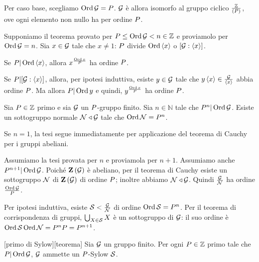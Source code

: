 Per caso base, scegliamo $\operatorname{\operatorname{Ord}}{\mathcal{G}} = P$.
$\mathcal{G}$ \`e allora isomorfo al gruppo ciclico
$\frac{\mathbb{Z}}{\left ( P \right )}$,
ove ogni elemento non nullo ha per ordine $P$.
\par
Supponiamo il teorema provato per
$P \leq \operatorname{\operatorname{Ord}}{\mathcal{G}} < n \in \mathbb{Z}$
e proviamolo per $\operatorname{\operatorname{Ord}}{\mathcal{G}} = n$.
Sia $x \in \mathcal{G}$ tale che $x \neq 1$:
$P$ divide $\operatorname{\operatorname{Ord}}{\left < x \right >}$ o
$[\mathcal{G}:\left < x \right >]$.
\par
Se $P | \operatorname{\operatorname{Ord}}{\left < x \right >}$, allora
$x^{\frac{\operatorname{\operatorname{Ord}}{x}}{P}}$ ha ordine $P$.
\par
Se $P | [\mathcal{G}:\left < x \right >]$,
allora, per ipotesi induttiva, esiste $y \in \mathcal{G}$ tale che
$y\left < x \right > \in \frac{\mathcal{G}}{\left < x \right >}$ abbia
ordine $P$. Ma allora $P | \operatorname{\operatorname{Ord}}{y}$ e quindi,
$y^{\frac{\operatorname{\operatorname{Ord}}{x}}{P}}$ ha ordine $P$.
\EndProof
\begin{Theorem}
	Sia $P \in \mathbb{Z}$ primo e sia
	$\mathcal{G}$ un $P$-gruppo finito.
	Sia $n \in \mathbb{N}$ tale che $P^n | \operatorname{\operatorname{Ord}}{\mathcal{G}}$.
	Esiste un sottogruppo normale
	$\mathcal{N} \triangleleft \mathcal{G}$ tale che
	$\operatorname{\operatorname{Ord}}{\mathcal{N}} = P^n$.
\end{Theorem}
\Proof
Se $n = 1$, la tesi segue immediatamente per applicazione del teorema di Cauchy
per i gruppi abeliani.
\par
Assumiamo la tesi provata per $n$ e proviamola per $n + 1$.
Assumiamo anche $P^{n + 1} | \operatorname{\operatorname{Ord}}{\mathcal{G}}$.
Poich\'e $\textbf{Z} \left ( \mathcal{G} \right )$ \`e abeliano,
per il teorema di Cauchy esiste un sottogruppo $\mathcal{N}$ di
$\textbf{Z} \left ( \mathcal{G} \right )$ di ordine $P$; inoltre abbiamo
$\mathcal{N} \triangleleft \mathcal{G}$.
Quindi $\frac{\mathcal{G}}{\mathcal{N}}$ ha ordine
$\frac{\operatorname{\operatorname{Ord}}{\mathcal{G}}}{P}$.
\par
Per ipotesi induttiva, esiste
$\mathcal{S} < \frac{\mathcal{G}}{\mathcal{N}}$
di ordine
$\operatorname{\operatorname{Ord}}{\mathcal{S}} = P^n$.
Per il teorema di corrispondenza di gruppi,
$\bigcup_{X \in \mathcal{S}} X$ \`e un sottogruppo di $\mathcal{G}$:
il suo ordine \`e
$\operatorname{\operatorname{Ord}}{\mathcal{S}} \operatorname{\operatorname{Ord}}{\mathcal{N}} =
P^n P = P^{n + 1}$.
\EndProof
\begin{Theorem}
[primo di Sylow][teorema]
	Sia $\mathcal{G}$ un gruppo finito.
	Per ogni $P \in \mathbb{Z}$ primo tale che
	$P | \operatorname{\operatorname{Ord}}{\mathcal{G}}$, $\mathcal{G}$ ammette
	un $P$-Sylow $\Sylow$.
\end{Theorem}
